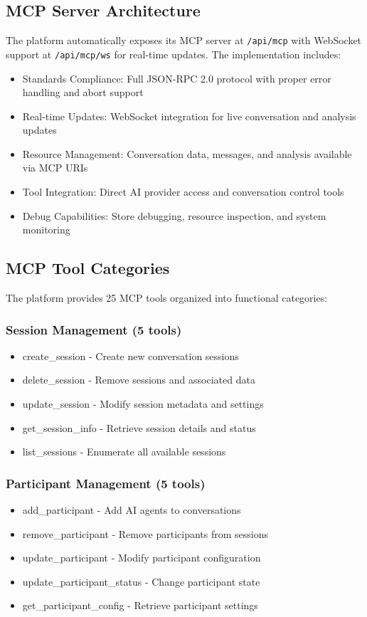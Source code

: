 \documentclass[11pt,letterpaper]{article}
\begin{document}
\subsection{MCP Server Architecture}

The platform automatically exposes its MCP server at \texttt{/api/mcp} with WebSocket support at \texttt{/api/mcp/ws} for real-time updates. The implementation includes:

\begin{itemize}
    \item Standards Compliance: Full JSON-RPC 2.0 protocol with proper error handling and abort support
    \item Real-time Updates: WebSocket integration for live conversation and analysis updates
    \item Resource Management: Conversation data, messages, and analysis available via MCP URIs
    \item Tool Integration: Direct AI provider access and conversation control tools
    \item Debug Capabilities: Store debugging, resource inspection, and system monitoring
\end{itemize}

\subsection{MCP Tool Categories}

The platform provides 25 MCP tools organized into functional categories:

\subsubsection{Session Management (5 tools)}
\begin{itemize}
    \item create\_session - Create new conversation sessions
    \item delete\_session - Remove sessions and associated data
    \item update\_session - Modify session metadata and settings
    \item get\_session\_info - Retrieve session details and status
    \item list\_sessions - Enumerate all available sessions
\end{itemize}

\subsubsection{Participant Management (5 tools)}
\begin{itemize}
    \item add\_participant - Add AI agents to conversations
    \item remove\_participant - Remove participants from sessions
    \item update\_participant - Modify participant configuration
    \item update\_participant\_status - Change participant state
    \item get\_participant\_config - Retrieve participant settings
\end{itemize}
\end{document}
